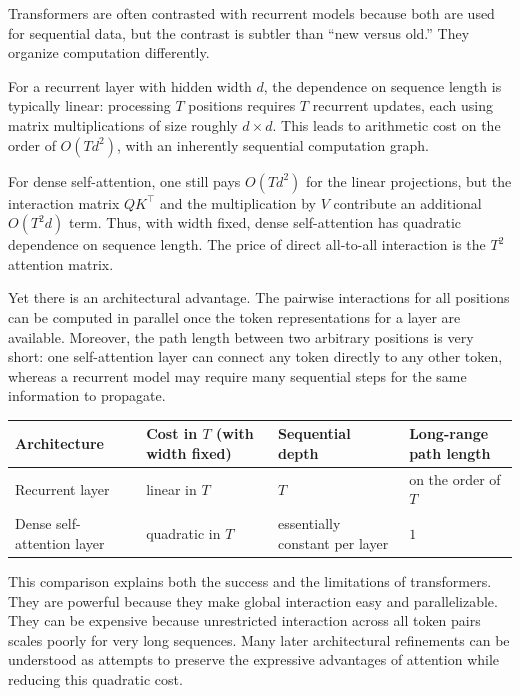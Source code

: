 Transformers are often contrasted with recurrent models because both are used for sequential data, but the contrast is subtler than ``new versus old.''
They organize computation differently.

\medskip

For a recurrent layer with hidden width \(d\), the dependence on sequence length is typically linear:
processing \(T\) positions requires \(T\) recurrent updates, each using matrix multiplications of size roughly \(d \times d\).
This leads to arithmetic cost on the order of \(O(Td^2)\), with an inherently sequential computation graph.

\medskip

For dense self-attention, one still pays \(O(Td^2)\) for the linear projections, but the interaction matrix \(QK^{\top}\) and the multiplication by \(V\) contribute an additional \(O(T^2 d)\) term.
Thus, with width fixed, dense self-attention has quadratic dependence on sequence length.
The price of direct all-to-all interaction is the \(T^2\) attention matrix.

\medskip

Yet there is an architectural advantage.
The pairwise interactions for all positions can be computed in parallel once the token representations for a layer are available.
Moreover, the path length between two arbitrary positions is very short:
one self-attention layer can connect any token directly to any other token, whereas a recurrent model may require many sequential steps for the same information to propagate.

\begin{center}
\begin{tabular}{|p{}|p{}|p{}|p{}|}
\hline
Architecture & Cost in \(T\) (with width fixed) & Sequential depth & Long-range path length \\
\hline
Recurrent layer & linear in \(T\) & \(T\) & on the order of \(T\) \\
Dense self-attention layer & quadratic in \(T\) & essentially constant per layer & \(1\) \\
\hline
\end{tabular}
\end{center}

This comparison explains both the success and the limitations of transformers.
They are powerful because they make global interaction easy and parallelizable.
They can be expensive because unrestricted interaction across all token pairs scales poorly for very long sequences.
Many later architectural refinements can be understood as attempts to preserve the expressive advantages of attention while reducing this quadratic cost.

